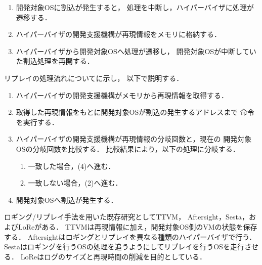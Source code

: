 \documentclass[submit,techreq,noauthor,dvipdfmx]{ipsj}
\begin{document}
\begin{description}
        \begin{enumerate}
            \item 
                開発対象OSに割込が発生すると，
                処理を中断し，ハイパーバイザに処理が遷移する．
            \item 
                ハイパーバイザの開発支援機構が再現情報をメモリに格納する．
            \item 
                ハイパーバイザから開発対象OSへ処理が遷移し，
                開発対象OSが中断していた割込処理を再開する．
        \end{enumerate}

        リプレイの処理流れについてに示し，
        以下で説明する．

        \begin{enumerate}
            \item 
                ハイパーバイザの開発支援機構がメモリから再現情報を取得する．
            \item 
                取得した再現情報をもとに開発対象OSが割込の発生するアドレスまで
                命令を実行する．
            \item 
                ハイパーバイザの開発支援機構が再現情報の分岐回数と，現在の
                開発対象OSの分岐回数を比較する．
                比較結果により，以下の処理に分岐する．
                \begin{enumerate}
                    \renewcommand{\labelenumii}{(\Alph{enumii})}
                    \item 一致した場合，(4)へ進む．
                    \item 一致しない場合，(2)へ進む．
                \end{enumerate}
            \item 
                開発対象OSへ割込が発生する．
        \end{enumerate}

        ロギング/リプレイ手法を用いた既存研究としてTTVM\cite{samuel}，
        Aftersight\cite{jim}，Sesta\cite{kawasaki}，およびLoRe\cite{li2013lore}がある．
        TTVMは再現情報に加え，開発対象OS側のVMの状態を保存する．
        Aftersightはロギングとリプレイを異なる種類のハイパーバイザで行う．
        Sestaはロギングを行うOSの処理を追うようにしてリプレイを行うOSを走行させる．
        LoReはログのサイズと再現時間の削減を目的としている．
\end{description}
\end{document}
